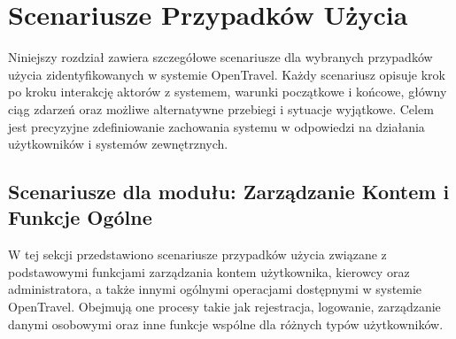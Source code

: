 \documentclass[a4paper,12pt]{article}
\begin{document}
\newpage
\section{Scenariusze Przypadków Użycia}
\label{sec:scenarios}
Niniejszy rozdział zawiera szczegółowe scenariusze dla wybranych przypadków użycia zidentyfikowanych w systemie OpenTravel. Każdy scenariusz opisuje krok po kroku interakcję aktorów z systemem, warunki początkowe i końcowe, główny ciąg zdarzeń oraz możliwe alternatywne przebiegi i sytuacje wyjątkowe. Celem jest precyzyjne zdefiniowanie zachowania systemu w odpowiedzi na działania użytkowników i systemów zewnętrznych.

\subsection{Scenariusze dla modułu: Zarządzanie Kontem i Funkcje Ogólne}
W tej sekcji przedstawiono scenariusze przypadków użycia związane z podstawowymi funkcjami zarządzania kontem użytkownika, kierowcy oraz administratora, a także innymi ogólnymi operacjami dostępnymi w systemie OpenTravel. Obejmują one procesy takie jak rejestracja, logowanie, zarządzanie danymi osobowymi oraz inne funkcje wspólne dla różnych typów użytkowników.
\end{document}

